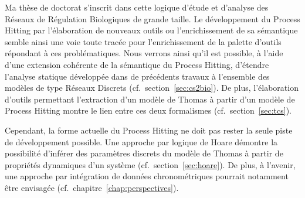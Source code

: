 Ma thèse de doctorat s'inscrit dans cette logique d'étude et d'analyse des Réseaux de Régulation Biologiques de grande taille.
Le développement du Process Hitting par l'élaboration de nouveaux outils ou l'enrichissement de sa sémantique semble ainsi une voie toute tracée pour l'enrichissement de la palette d'outils répondant à ces problématiques.
Nous verrons ainsi qu'il est possible, à l'aide d'une extension cohérente de la sémantique du Process Hitting, d'étendre l'analyse statique développée dans de précédents travaux à l'ensemble des modèles de type Réseaux Discrets (cf.~section~\ref{sec:cs2bio}).
De plus, l'élaboration d'outils permettant l'extraction d'un modèle de Thomas à partir d'un modèle de Process Hitting montre le lien entre ces deux formalismes (cf.~section~\ref{sec:tcs}).

Cependant, la forme actuelle du Process Hitting ne doit pas rester la seule piste de développement possible.
Une approche par logique de Hoare démontre la possibilité d'inférer des paramètres discrets du modèle de Thomas à partir de propriétés dynamiques d'un système (cf.~section~\ref{sec:hoare}).
De plus, à l'avenir, une approche par intégration de données chronométriques pourrait notamment être envisagée (cf.~chapitre~\ref{chap:perspectives}).
